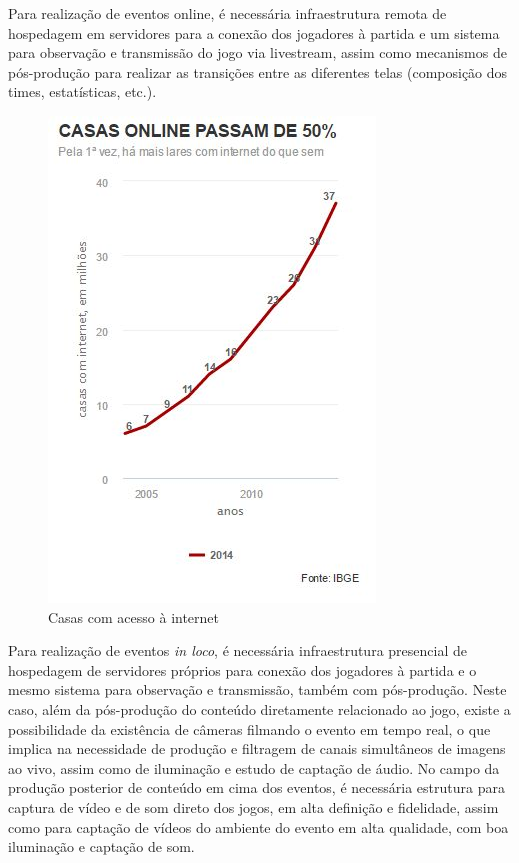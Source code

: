 \documentclass[a4paper, 12pt]{paper}
\begin{document}
Para realização de eventos online, é necessária infraestrutura remota de hospedagem em servidores para a conexão dos jogadores à partida e um sistema para observação e transmissão do jogo via livestream, assim como mecanismos de pós-produção para realizar as transições entre as diferentes telas (composição dos times, estatísticas, etc.).


\begin{figure}
    \includegraphics[scale=0.5]{img/img04.png}
    \caption{Casas com acesso \`{a} internet}
\end{figure}

Para realização de eventos \textit{in loco}, é necessária infraestrutura presencial de hospedagem de servidores próprios para conexão dos jogadores à partida e o mesmo sistema para observação e transmissão, também com pós-produção. Neste caso, além da pós-produção do conteúdo diretamente relacionado ao jogo, existe a possibilidade da existência de câmeras filmando o evento em tempo real, o que implica na necessidade de produção e filtragem de canais simultâneos de imagens ao vivo, assim como de iluminação e estudo de captação de áudio.
No campo da produção posterior de conteúdo em cima dos eventos, é necessária estrutura para captura de vídeo e de som direto dos jogos, em alta definição e fidelidade, assim como para captação de vídeos do ambiente do evento em alta qualidade, com boa iluminação e captação de som.
\end{document}
